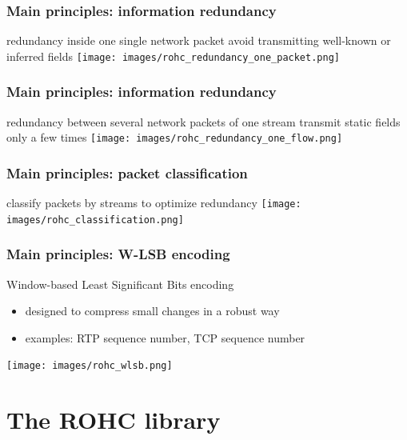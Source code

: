 \documentclass[utf8]{beamer}
\begin{document}
\begin{frame}
	\frametitle{Main principles: information redundancy}
	\begin{block}{redundancy inside one single network packet}
		avoid transmitting well-known or inferred fields
		\texttt{[image: images/rohc\_redundancy\_one\_packet.png]}
	\end{block}
\end{frame}

\begin{frame}
	\frametitle{Main principles: information redundancy}
	\begin{block}{redundancy between several network packets of one stream}
		transmit static fields only a few times
		\texttt{[image: images/rohc\_redundancy\_one\_flow.png]}
	\end{block}
\end{frame}

\begin{frame}
	\frametitle{Main principles: packet classification}
	\begin{block}{classify packets by streams to optimize redundancy}
		\texttt{[image: images/rohc\_classification.png]}
	\end{block}
\end{frame}

\begin{frame}
	\frametitle{Main principles: W-LSB encoding}
	\begin{block}{Window-based Least Significant Bits encoding}
		\begin{itemize}
			\item designed to compress small changes in a robust way
			\item examples: RTP sequence number, TCP sequence number
		\end{itemize}
		\texttt{[image: images/rohc\_wlsb.png]}
	\end{block}
\end{frame}





\section{The ROHC library}
\end{document}
